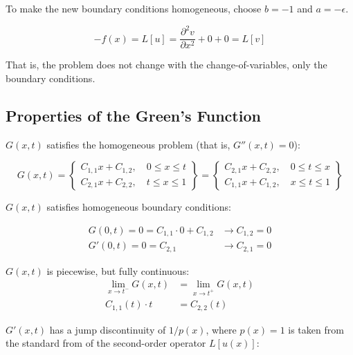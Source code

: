 \documentclass[10pt]{article}
\begin{document}
To make the new boundary conditions homogeneous, choose $b=-1$ and $a=-\epsilon$.

$$
    -f(x) = L[u] = \frac{\partial^2 v}{\partial x^2} + 0 + 0 = L[v]
$$

That is, the problem does not change with the change-of-variables, only the boundary conditions.

\subsection{Properties of the Green's Function}
$$\quad$$
$G(x,t)$ satisfies the homogeneous problem (that is, $G''(x,t) = 0$):
    
\begin{equation}
    G(x,t) = 
    \left\{ \begin{matrix}
        C_{1,1} x + C_{1,2}, \quad 0 \le x \le t \\ 
        C_{2,1} x + C_{2,2}, \quad t \le x \le 1
    \end{matrix} \right\}
    =
    \left\{ \begin{matrix}
        C_{2,1} x + C_{2,2}, \quad 0 \le t \le x \\ 
        C_{1,1} x + C_{1,2}, \quad x \le t \le 1
    \end{matrix} \right\} 
\end{equation}

$G(x,t)$ satisfies homogeneous boundary conditions:
    
\begin{equation}
    \begin{split}
        G(0,t) = 0 = C_{1,1} \cdot 0 + C_{1,2}  &\xrightarrow{ } C_{1,2} = 0 \\
        G'(0,t) = 0 = C_{2,1} \quad \quad  &\xrightarrow{ } C_{2,1} = 0
    \end{split}
\end{equation}

$G(x,t)$ is piecewise, but fully continuous:
\begin{equation}
    \label{eqn:continuous}
    \begin{split}
        \lim _{ x \rightarrow t^- }{G(x,t)} &= \lim _{ x \rightarrow t^+ }{G(x,t)} \\
        C_{1,1}(t)\cdot t &= C_{2,2}(t)
    \end{split}
\end{equation}

$G'(x,t)$ has a jump discontinuity of $1/p(x)$, where $p(x)=1$ is taken from the standard from of the second-order operator $L[u(x)]$:
    
\end{document}
